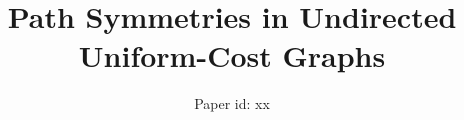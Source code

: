 \documentclass{article}
\begin{document}
\title{Path Symmetries in Undirected Uniform-Cost Graphs}
\author{
Paper id: xx
}

\maketitle












%



\end{document}
